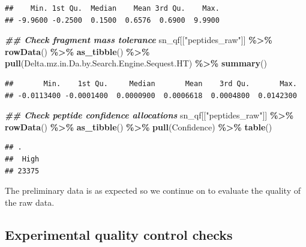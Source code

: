 \documentclass[9pt,a4paper,]{extarticle}
\newenvironment{Shaded}{\begin{snugshade}}{\end{snugshade}}
\newcommand{\DocumentationTok}[1]{\textcolor[rgb]{0.56,0.35,0.01}{\textbf{\textit{#1}}}}
\newcommand{\FunctionTok}[1]{\textcolor[rgb]{0.13,0.29,0.53}{\textbf{#1}}}
\newcommand{\NormalTok}[1]{#1}
\newcommand{\SpecialCharTok}[1]{\textcolor[rgb]{0.81,0.36,0.00}{\textbf{#1}}}
\newcommand{\StringTok}[1]{\textcolor[rgb]{0.31,0.60,0.02}{#1}}
\begin{document}
\begin{verbatim}
##    Min. 1st Qu.  Median    Mean 3rd Qu.    Max. 
## -9.9600 -0.2500  0.1500  0.6576  0.6900  9.9900
\end{verbatim}

\begin{Shaded}
\begin{Highlighting}[]
\DocumentationTok{\#\# Check fragment mass tolerance}
\NormalTok{sn\_qf[[}\StringTok{"peptides\_raw"}\NormalTok{]] }\SpecialCharTok{\%\textgreater{}\%}
  \FunctionTok{rowData}\NormalTok{() }\SpecialCharTok{\%\textgreater{}\%} 
  \FunctionTok{as\_tibble}\NormalTok{() }\SpecialCharTok{\%\textgreater{}\%} 
  \FunctionTok{pull}\NormalTok{(Delta.mz.in.Da.by.Search.Engine.Sequest.HT) }\SpecialCharTok{\%\textgreater{}\%} 
  \FunctionTok{summary}\NormalTok{()}
\end{Highlighting}
\end{Shaded}

\begin{verbatim}
##       Min.    1st Qu.     Median       Mean    3rd Qu.       Max. 
## -0.0113400 -0.0001400  0.0000900  0.0006618  0.0004800  0.0142300
\end{verbatim}

\begin{Shaded}
\begin{Highlighting}[]
\DocumentationTok{\#\# Check peptide confidence allocations}
\NormalTok{sn\_qf[[}\StringTok{"peptides\_raw"}\NormalTok{]] }\SpecialCharTok{\%\textgreater{}\%}
  \FunctionTok{rowData}\NormalTok{() }\SpecialCharTok{\%\textgreater{}\%} 
  \FunctionTok{as\_tibble}\NormalTok{() }\SpecialCharTok{\%\textgreater{}\%} 
  \FunctionTok{pull}\NormalTok{(Confidence) }\SpecialCharTok{\%\textgreater{}\%} 
  \FunctionTok{table}\NormalTok{()}
\end{Highlighting}
\end{Shaded}

\begin{verbatim}
## .
##  High 
## 23375
\end{verbatim}

The preliminary data is as expected so we continue on to evaluate the quality
of the raw data.

\hypertarget{experimental-quality-control-checks-1}{%
\subsection{Experimental quality control checks}\label{experimental-quality-control-checks-1}}
\end{document}
